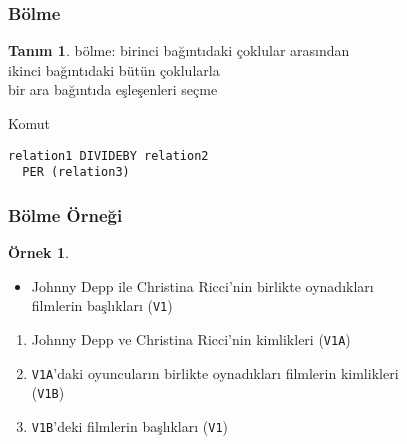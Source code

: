 \documentclass[dvipsnames]{beamer}
\theoremstyle{definition}
\newtheorem{tanim}[theorem]{Tanım}
\theoremstyle{example}
\newtheorem{ornek}[theorem]{Örnek}
\theoremstyle{plain}
\begin{document}
\begin{frame}[fragile]
  \frametitle{Bölme}

  \begin{tanim}
    \alert{bölme}: birinci bağıntıdaki çoklular arasından\\
      ikinci bağıntıdaki bütün çoklularla\\
      bir ara bağıntıda eşleşenleri seçme
  \end{tanim}

  \pause
  \begin{block}{Komut}
    \begin{lstlisting}
relation1 DIVIDEBY relation2
  PER (relation3)
    \end{lstlisting}
  \end{block}
\end{frame}

\begin{frame}
  \frametitle{Bölme Örneği}

  \begin{ornek}
    \begin{itemize}
      \item Johnny Depp ile Christina Ricci'nin birlikte oynadıkları\\
        filmlerin başlıkları (\texttt{V1})
    \end{itemize}

    \pause
    \begin{enumerate}
      \item Johnny Depp ve Christina Ricci'nin kimlikleri (\texttt{V1A})

      \pause
      \item \texttt{V1A}'daki oyuncuların birlikte oynadıkları filmlerin
        kimlikleri\\
        (\texttt{V1B})

      \pause
      \item \texttt{V1B}'deki filmlerin başlıkları (\texttt{V1})
    \end{enumerate}
  \end{ornek}
\end{frame}
\end{document}
